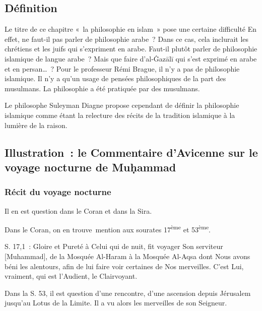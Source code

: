 \subsection{Définition
}
Le titre de ce chapitre «~la philosophie en islam~» pose une certaine
difficulté En effet, ne faut-il pas parler de philosophie arabe~? Dans
ce cas, cela inclurait les chrétiens et les juifs qui s'expriment en
arabe. Faut-il plutôt parler de philosophie islamique de langue arabe~?
Mais que faire d'al-Ġazālī \label{theol:AlGazali26} qui s'est exprimé en arabe et en
persan\ldots~? Pour le professeur Rémi Brague, il n'y a pas de
philosophie islamique. Il n'y a qu'un usage de pensées philosophiques de
la part des musulmans. La philosophie a été pratiquée par des musulmans.
\begin{Def}
Le philosophe Suleyman Diagne propose cependant de définir la
philosophie islamique comme étant la relecture des récits de la
tradition islamique à la lumière de la raison.

\end{Def}


\subsection{Illustration~: le Commentaire d'Avicenne
sur le voyage nocturne de Muḥammad
}

\subsubsection{Récit du voyage
nocturne}

Il en est question dans le Coran et dans la Sira.

Dans le Coran, on en trouve~mention aux sourates 17\textsuperscript{ème}
et 53\textsuperscript{ème}.

S. 17,1~: Gloire et Pureté à Celui qui de nuit, fit voyager Son
serviteur {[}Muhammad{]}, de la Mosquée Al-Haram à la Mosquée Al-Aqsa
dont Nous avons béni les alentours, afin de lui faire voir certaines de
Nos merveilles. C'est Lui, vraiment, qui est l'Audient, le
Clairvoyant.
  

Dans la S. 53, il est question d'une rencontre, d'une ascension depuis
Jérusalem jusqu'au Lotus de la Limite. Il a vu alors les merveilles de
son Seigneur.

